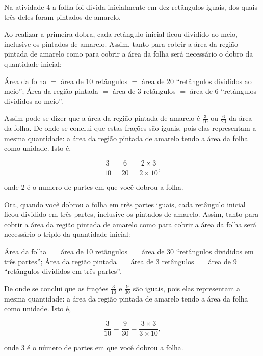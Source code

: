 \documentclass[a4,12pt]{book}
\begin{document}
\begin{refletindo*}

Na atividade 4 a folha foi divida inicialmente em dez retângulos iguais, dos quais três deles foram pintados de amarelo.

Ao realizar a primeira dobra, cada retângulo inicial ficou dividido ao meio, inclusive os pintados de amarelo. Assim, tanto para cobrir a área da região pintada de amarelo como para cobrir a área da folha será necessário o dobro da quantidade inicial:

Área da folha $=$ área de 10 retângulos $=$ área de 20 ``retângulos divididos ao meio'';\mbox{} \newline 
Área da região pintada $=$  área de 3 retângulos $=$ área de 6 ``retângulos divididos ao meio''.

Assim pode-se dizer que a área da região pintada de amarelo é $\frac{3}{10}$ ou  $\frac{6}{20}$ da área da folha. De onde se conclui que estas frações são iguais, pois elas representam a mesma quantidade: a área da região pintada de amarelo tendo a área da folha como unidade. Isto é,

$$\dfrac{3}{10} = \dfrac{6}{20} = \dfrac{2 \times 3}{2 \times 10},$$

onde 2 é o numero de partes em que você dobrou a folha.

Ora, quando você dobrou a folha em três partes iguais, cada retângulo inicial ficou dividido em três partes, inclusive os pintados de amarelo. Assim, tanto para cobrir a área da região pintada de amarelo como para cobrir a área da folha será necessário o triplo da quantidade inicial:

Área da folha $=$ área de 10 retângulos $=$ área de 30 ``retângulos divididos em três partes'';\mbox{} \newline 
Área da região pintada $=$  área de 3 retângulos $=$ área de 9 ``retângulos divididos em três partes''.

De onde se conclui que as frações $\frac{3}{10}$ e $\frac{9}{30}$  são iguais, pois elas representam a mesma quantidade: a área da região pintada de amarelo tendo a área da folha como unidade. Isto é,

$$\dfrac{3}{10} = \dfrac{9}{30} = \dfrac{3 \times 3}{3 \times 10},$$

onde 3 é o número de partes em que você dobrou a folha. 


\end{refletindo*}
\end{document}
